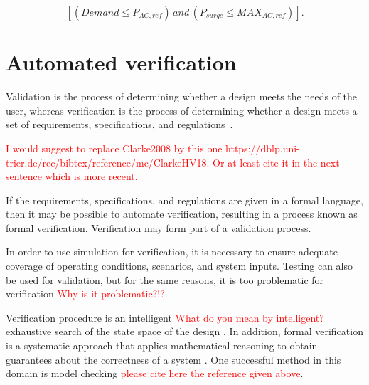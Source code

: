 \documentclass[journal]{IEEEtran}
\begin{document}
\begin{equation}
\label{eq:invcheck} 
\left[ (Demand \leq P_{AC,ref}) \, and \, (P_{surge} \leq MAX_{AC,ref}) \right].
\end{equation}

\section{Automated verification}
\label{sec:AutomatedVerification}

Validation is the process of determining whether a design meets the needs of the user, whereas verification is the process of determining whether a design meets a set of requirements, specifications, and regulations~\cite{Clarke2008}.  

\textcolor{red}{I would suggest to replace Clarke2008 by this one https://dblp.uni-trier.de/rec/bibtex/reference/mc/ClarkeHV18. Or at least cite it in the next sentence which is more recent.}

If the requirements, specifications, and regulations are given in a formal language, then it may be possible to automate verification, resulting in a process known as formal verification. Verification may form part of a validation process.

In order to use simulation for verification, it is necessary to ensure adequate coverage of operating conditions, scenarios, and system inputs. Testing can also be used for validation, but for the same reasons, it is too problematic for verification \textcolor{red}{Why is it problematic?!?}.
 
Verification procedure is an intelligent \textcolor{red}{What do you mean by intelligent?} exhaustive search of the state space of the design \cite{Clarke2008}. In addition, formal verification is a systematic approach that applies mathematical reasoning to obtain guarantees about the correctness of a system \cite{Forejt2011}. One successful method in this domain is model checking \textcolor{red}{please cite here the reference given above}.
\end{document}
